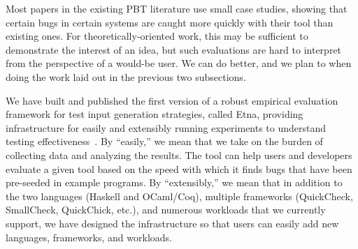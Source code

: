 

%
%

Most papers in the existing PBT literature use small case studies,
showing that certain bugs in certain systems
are caught more quickly with their tool than existing ones. For
theoretically-oriented work, this may be sufficient
to demonstrate the interest of an idea, but such evaluations
are hard to interpret from the perspective of a would-be user.
We can do better, and we plan to when doing the work laid out in the previous
two subsections.

We have built and published the first version of a robust empirical evaluation
framework for
test input generation strategies, called Etna, providing infrastructure
for easily and extensibly running experiments to understand testing
effectiveness~\cite{shi2023etna}.  By ``easily,'' we mean that we take on the burden of
collecting data and analyzing the results.  The tool
can help users and developers evaluate a given tool based on
the
speed with which it finds bugs that have been pre-seeded in example programs. By
``extensibly,'' we mean that in addition to the two languages (Haskell and
OCaml/Coq), multiple frameworks (QuickCheck, SmallCheck, QuickChick, etc.), and
numerous workloads that we currently support, we have designed the
infrastructure so that users can easily add new
languages, frameworks, and workloads.

